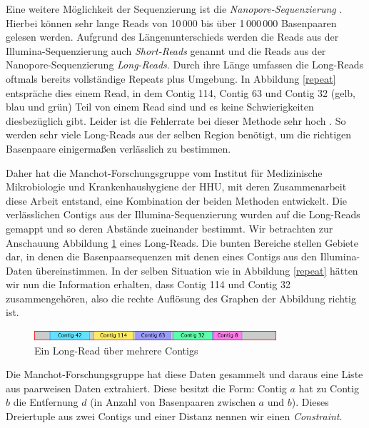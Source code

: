 Eine weitere Möglichkeit der Sequenzierung ist die 
\emph{Nanopore-Sequenzierung} \cite{Nanopore}. Hierbei können sehr lange Reads von 10\,000 bis über 1\,000\,000 Basenpaaren gelesen werden. Aufgrund des Längenunterschieds werden die Reads aus der 
Illumina-Sequenzierung auch \emph{Short-Reads} genannt 
und die Reads aus der Nanopore-Sequenzierung \emph{Long-Reads}. Durch ihre Länge umfassen die Long-Reads oftmals bereits vollständige Repeats plus Umgebung. In 
Abbildung \ref{repeat} entspräche dies einem Read, in dem Contig 114, Contig 63 und Contig 32 (gelb, blau und grün) Teil von einem Read sind und es keine Schwierigkeiten diesbezüglich gibt. Leider ist die Fehlerrate bei dieser Methode sehr hoch \cite{Harris475194}. 
So werden sehr viele Long-Reads aus der selben Region benötigt, um die richtigen Basenpaare einigermaßen verlässlich zu bestimmen.


Daher hat die Manchot-Forschungsgruppe vom Institut für Medizinische Mikrobiologie und Krankenhaushygiene der HHU, mit deren Zusammenarbeit diese Arbeit entstand, eine Kombination der beiden Methoden entwickelt.
Die verlässlichen Contigs aus der 
Illumina-Sequenzierung wurden auf die Long-Reads gemappt und so deren Abstände zueinander bestimmt. 
Wir betrachten zur Anschauung Abbildung \ref{longread} eines Long-Reads. Die bunten Bereiche stellen Gebiete dar, in denen die Basenpaarsequenzen mit denen eines Contigs aus den 
Illumina-Daten übereinstimmen. In der selben Situation wie in Abbildung \ref{repeat} hätten wir nun die Information erhalten, dass Contig 114 und Contig 32 zusammengehören, also die rechte Auflösung des Graphen der Abbildung richtig ist.
\begin{figure}
\begin{center}
\includegraphics[width=0.8\textwidth]{bilder/longread}
\end{center}
\caption{Ein Long-Read über mehrere Contigs}
\label{longread}
\end{figure}

Die Manchot-Forschungsgruppe hat diese Daten gesammelt und daraus eine Liste aus paarweisen Daten extrahiert. Diese besitzt die Form: Contig $a$ hat zu Contig $b$ die Entfernung $d$ (in Anzahl von Basenpaaren zwischen $a$ und $b$). Dieses Dreiertuple aus zwei Contigs und einer Distanz nennen wir einen \emph{Constraint}.


